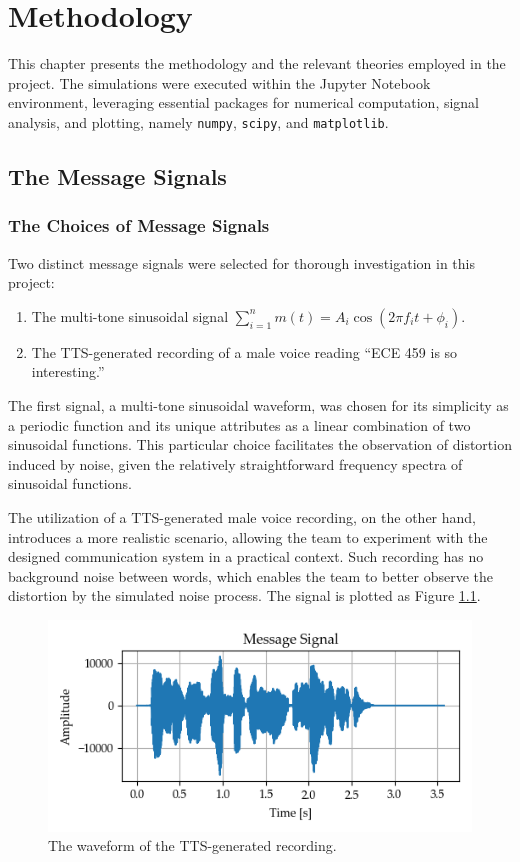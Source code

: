 \documentclass[../ECE459FinalProjectReport.tex]{subfiles}
\begin{document}
\chapter{Methodology}
This chapter presents the methodology and the relevant theories employed in the project. The simulations were executed within the Jupyter Notebook environment, leveraging essential packages for numerical computation, signal analysis, and plotting, namely \verb|numpy|, \verb|scipy|, and \verb|matplotlib|.

\section{The Message Signals}
\subsection{The Choices of Message Signals}
Two distinct message signals were selected for thorough investigation in this project:
\begin{enumerate}
    \item The multi-tone sinusoidal signal $\sum_{i=1}^n m (t) = A_i\cos(2\pi f_i t + \phi_i)$.
    \item The TTS-generated recording of a male voice reading ``ECE 459 is so interesting.''
\end{enumerate}

The first signal, a multi-tone sinusoidal waveform, was chosen for its simplicity as a periodic function and its unique attributes as a linear combination of two sinusoidal functions. This particular choice facilitates the observation of distortion induced by noise, given the relatively straightforward frequency spectra of sinusoidal functions.

The utilization of a TTS-generated male voice recording, on the other hand, introduces a more realistic scenario, allowing the team to experiment with the designed communication system in a practical context. Such recording has no background noise between words, which enables the team to better observe the distortion by the simulated noise process. The signal is plotted as Figure \ref{fig:audio-time}.
\begin{figure}[tb]
    \centering
    \includegraphics[width=0.5\linewidth]{plots/audio_time.png}
    \caption{The waveform of the TTS-generated recording.}
    \label{fig:audio-time}
\end{figure}
\end{document}
